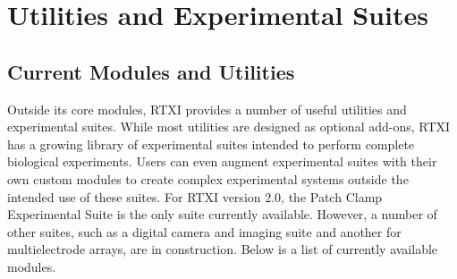 \clearpage
\chapter{Utilities and Experimental Suites}
\section{Current Modules and Utilities}
\label{rtximoduleslist}
Outside its core modules, RTXI provides a number of useful utilities and experimental suites. While most utilities are designed as optional add-ons, RTXI has a growing library of experimental suites intended to perform complete biological experiments. Users can even augment experimental suites with their own custom modules to create complex experimental systems outside the intended use of these suites. For RTXI version 2.0, the Patch Clamp Experimental Suite is the only suite currently available. However, a number of other suites, such as a digital camera and imaging suite and another for multielectrode arrays, are in construction. Below is a list of currently available modules. 

